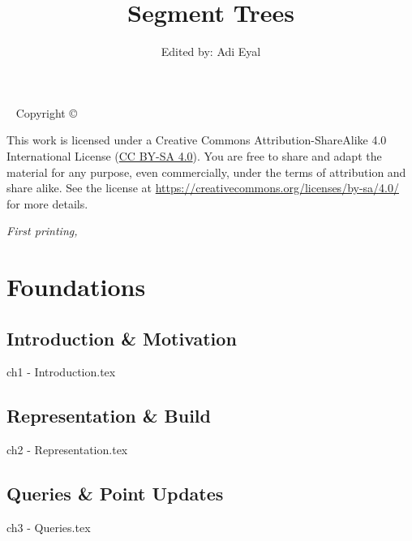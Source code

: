 \documentclass{tufte-book}
\title{Segment Trees}
\author{Edited by: Adi Eyal}
\begin{document}
\frontmatter

\newpage\thispagestyle{empty}

\maketitle


\newpage
\begin{fullwidth}
~\vfill
\thispagestyle{empty}
\setlength{\parindent}{0pt}
\setlength{\parskip}{\baselineskip}
Copyright \copyright\ \the\year\ \thanklessauthor

\par{}

\par{}

\par This work is licensed under a Creative Commons Attribution-ShareAlike 4.0 International License (\href{https://creativecommons.org/licenses/by-sa/4.0/}{CC BY-SA 4.0}). You are free to share and adapt the material for any purpose, even commercially, under the terms of attribution and share alike. See the license at \url{https://creativecommons.org/licenses/by-sa/4.0/} for more details.

\par\textit{First printing, \monthyear}
\end{fullwidth}

\tableofcontents

\listoffigures

\listoftables

\mainmatter

\part{Foundations}
\chapter{Introduction \& Motivation}
{ch1 - Introduction.tex}
\chapter{Representation \& Build}
{ch2 - Representation.tex}
\chapter{Queries \& Point Updates}
{ch3 - Queries.tex}
\end{document}
